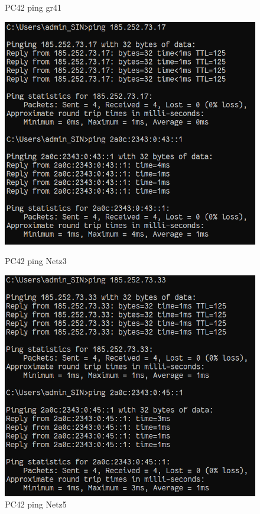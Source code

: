 \documentclass{article}
\begin{document}
\begin{figure}[!htp]
\begin{minipage}[b]{0.2\textwidth}
    \caption{PC42 ping gr41}
  \end{minipage}
  \hspace{0.8cm}
  \begin{minipage}[b]{0.2\textwidth}
    \includegraphics[width=\textwidth]{Arbeitsergebnisse/PC42/pc42_ping_net3.png}
    \caption{PC42 ping Netz3}
  \end{minipage}
  \hspace{0.8cm}
  \begin{minipage}[b]{0.2\textwidth}
    \includegraphics[width=\textwidth]{Arbeitsergebnisse/PC42/pc42_ping_net5.png}
    \caption{PC42 ping Netz5}
  \end{minipage}
\end{figure}
\end{document}

